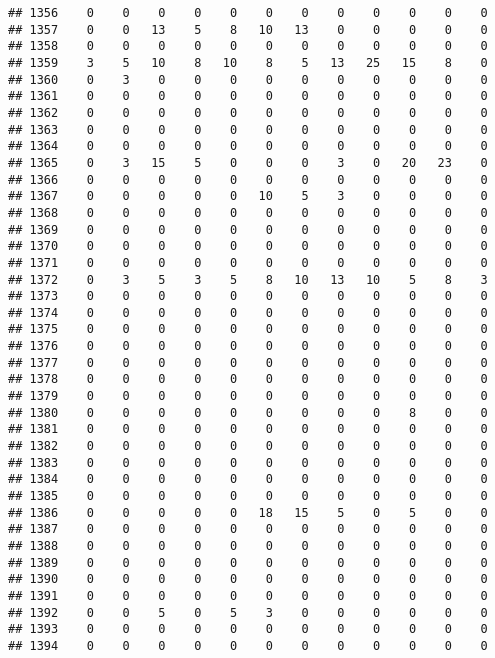 \documentclass[]{article}
\begin{document}
\begin{verbatim}
## 1356    0    0    0    0    0    0    0    0    0    0    0    0
## 1357    0    0   13    5    8   10   13    0    0    0    0    0
## 1358    0    0    0    0    0    0    0    0    0    0    0    0
## 1359    3    5   10    8   10    8    5   13   25   15    8    0
## 1360    0    3    0    0    0    0    0    0    0    0    0    0
## 1361    0    0    0    0    0    0    0    0    0    0    0    0
## 1362    0    0    0    0    0    0    0    0    0    0    0    0
## 1363    0    0    0    0    0    0    0    0    0    0    0    0
## 1364    0    0    0    0    0    0    0    0    0    0    0    0
## 1365    0    3   15    5    0    0    0    3    0   20   23    0
## 1366    0    0    0    0    0    0    0    0    0    0    0    0
## 1367    0    0    0    0    0   10    5    3    0    0    0    0
## 1368    0    0    0    0    0    0    0    0    0    0    0    0
## 1369    0    0    0    0    0    0    0    0    0    0    0    0
## 1370    0    0    0    0    0    0    0    0    0    0    0    0
## 1371    0    0    0    0    0    0    0    0    0    0    0    0
## 1372    0    3    5    3    5    8   10   13   10    5    8    3
## 1373    0    0    0    0    0    0    0    0    0    0    0    0
## 1374    0    0    0    0    0    0    0    0    0    0    0    0
## 1375    0    0    0    0    0    0    0    0    0    0    0    0
## 1376    0    0    0    0    0    0    0    0    0    0    0    0
## 1377    0    0    0    0    0    0    0    0    0    0    0    0
## 1378    0    0    0    0    0    0    0    0    0    0    0    0
## 1379    0    0    0    0    0    0    0    0    0    0    0    0
## 1380    0    0    0    0    0    0    0    0    0    8    0    0
## 1381    0    0    0    0    0    0    0    0    0    0    0    0
## 1382    0    0    0    0    0    0    0    0    0    0    0    0
## 1383    0    0    0    0    0    0    0    0    0    0    0    0
## 1384    0    0    0    0    0    0    0    0    0    0    0    0
## 1385    0    0    0    0    0    0    0    0    0    0    0    0
## 1386    0    0    0    0    0   18   15    5    0    5    0    0
## 1387    0    0    0    0    0    0    0    0    0    0    0    0
## 1388    0    0    0    0    0    0    0    0    0    0    0    0
## 1389    0    0    0    0    0    0    0    0    0    0    0    0
## 1390    0    0    0    0    0    0    0    0    0    0    0    0
## 1391    0    0    0    0    0    0    0    0    0    0    0    0
## 1392    0    0    5    0    5    3    0    0    0    0    0    0
## 1393    0    0    0    0    0    0    0    0    0    0    0    0
## 1394    0    0    0    0    0    0    0    0    0    0    0    0

\end{verbatim}
\end{document}
